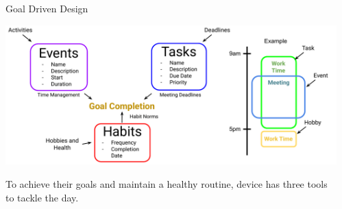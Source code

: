 \documentclass[final, cmyk]{beamer}
\newlength{\sepwidth}
\newlength{\colwidth}
\newcommand{\separatorcolumn}{\begin{column}{\sepwidth}\end{column}}
\begin{document}
\begin{frame}[t]
\begin{columns}[t]
    \separatorcolumn

    \begin{column}{\colwidth} 

      \begin{block}{Goal Driven Design}
        \begin{center}
          \vskip 0.5cm
          \includegraphics[width = \textwidth]{entry_logic.pdf}
        \end{center}
        To achieve their goals and maintain a healthy routine, device has
        three tools to tackle the day.
      \end{block}


\end{column}
\end{columns}
\end{frame}
\end{document}
